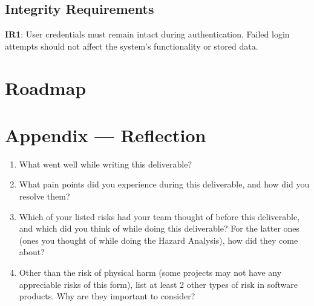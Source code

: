 \documentclass{article}
\begin{document}
\subsection{Integrity Requirements}
\textbf{IR1}: User credentials must remain intact during authentication. Failed login attempts should not affect the system's functionality or stored data.



\section{Roadmap}


\newpage{}

\section*{Appendix --- Reflection}




\begin{enumerate}
    \item What went well while writing this deliverable? 
    \item What pain points did you experience during this deliverable, and how
    did you resolve them?
    \item Which of your listed risks had your team thought of before this
    deliverable, and which did you think of while doing this deliverable? For
    the latter ones (ones you thought of while doing the Hazard Analysis), how
    did they come about?
    \item Other than the risk of physical harm (some projects may not have any
    appreciable risks of this form), list at least 2 other types of risk in
    software products. Why are they important to consider?
\end{enumerate}
\end{document}
